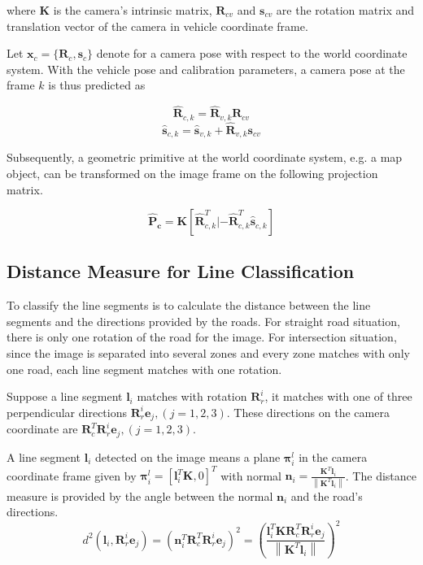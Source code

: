 \documentclass[letterpaper, 10 pt, conference]{ieeeconf}  %
\begin{document}
where $\mathbf{K}$ is the camera's intrinsic matrix, $\mathbf{R}_{cv}$ and $\mathbf{s}_{cv}$ are the rotation matrix and translation vector of the camera in vehicle coordinate frame.

Let $\mathbf{x}_{c} = \{\mathbf{R}_{c}, \mathbf{s}_{c}\}$ denote for a camera pose with respect to the world coordinate system. With the vehicle pose and calibration parameters, a camera pose at the frame $k$ is thus predicted as

\begin{equation}
\hat{\mathbf{R}}_{c,k} = \hat{\mathbf{R}}_{v,k} \mathbf{R}_{cv}
\label{eq:R_c}
\end{equation}
\begin{equation}
\hat{\mathbf{s}}_{c,k} = \hat{\mathbf{s}}_{v,k} + \hat{\mathbf{R}}_{v,k} \mathbf{s}_{cv}
\label{eq:S_c}
\end{equation}

Subsequently, a geometric primitive at the world coordinate system, e.g. a map object, can be transformed on the image frame on the following projection matrix.

\begin{equation}
\mathbf{\hat{P}_{c}}=\mathbf{K}[\hat{\mathbf{R}}_{c,k}^T|-\hat{\mathbf{R}}_{c,k}^T\hat{\mathbf{s}}_{c,k}]
\end{equation}

\subsection{Distance Measure for Line Classification}
To classify the line segments is to calculate the distance between the line segments and the directions provided by the roads. For straight road situation, there is only one rotation of the road for the image. For intersection situation, since the image is separated into several zones and every zone matches with only one road, each line segment matches with one rotation.

Suppose a line segment $\mathbf{l}_i$ matches with rotation $\mathbf{R}_r^i$, it matches with one of three perpendicular directions $\mathbf{R}_r^i\mathbf{e}_j,(j=1,2,3)$. These directions on the camera coordinate are $\mathbf{R}_c^T\mathbf{R}_r^i\mathbf{e}_j,(j=1,2,3)$.

A line segment $\mathbf{l}_i$ detected on the image means a plane $\mathbf{\pi}_i^l$ in the camera coordinate frame given by $\mathbf{\pi}_i^l = \left[\mathbf{l}_i^T\mathbf{K}, 0\right]^T$ with normal $\mathbf{n}_i=\frac{\mathbf{K}^T\mathbf{l}_i}{\left\|\mathbf{K}^T\mathbf{l}_i\right\|}$. The distance measure is provided by the angle between the normal $\mathbf{n}_i$ and the road's directions.
\begin{equation}
d^2(\mathbf{l}_i,\mathbf{R}_r^i\mathbf{e}_j) = {\left(\mathbf{n}_i^T\mathbf{R}_c^T\mathbf{R}_r^i\mathbf{e}_j\right)}^2 = { \left(\frac  {\mathbf{l}_i^T\mathbf{K}\mathbf{R}_c^T\mathbf{R}_r^i\mathbf{e}_j}
                {\left\|\mathbf{K}^T\mathbf{l}_i\right\|}
    \right)
  }^2
\label{eq:d_3d}
\end{equation}
\end{document}
